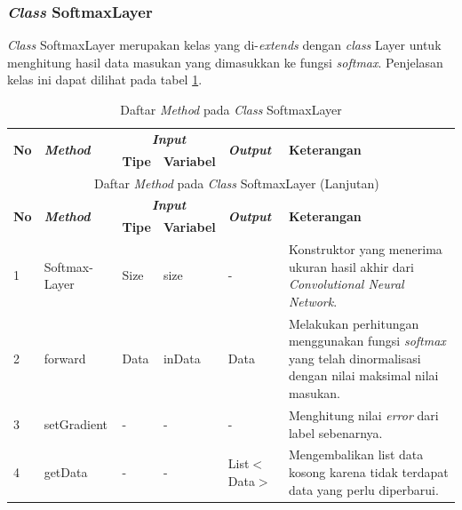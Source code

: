 \subsubsection{\textit{Class} SoftmaxLayer}
\noindent \textit{Class} SoftmaxLayer merupakan kelas yang di-\textit{extends} dengan \textit{class} Layer untuk menghitung hasil data masukan yang dimasukkan ke fungsi \textit{softmax}. Penjelasan kelas ini dapat dilihat pada tabel \ref{tbl:classSoftmaxLayer}.
\begingroup
\setlength{\LTleft}{-20cm plus -1fill}
\setlength{\LTright}{\LTleft}
\begin{small}
\begin{longtable}{|p{0.4cm}|p{2cm}|p{1.8cm}|p{1.8cm}|p{1.7cm}|p{3.55cm}|}
	\caption{Daftar \textit{Method} pada \textit{Class} SoftmaxLayer \label{tbl:classSoftmaxLayer}}\\
	\hline
	\multirow{2}{*}{\textbf{No}} & \multirow{2}{*}{\textit{\textbf{Method}}} & \multicolumn{2}{c|}{\textit{\textbf{Input}}} & \multirow{2}{*}{\textit{\textbf{Output}}} & 
	\multirow{2}{*}{\textbf{Keterangan}}\\
	\cline{3-4}
	& & \textbf{Tipe} & \textbf{Variabel} & & \\
	\endfirsthead
	\multicolumn{6}{c}{\textbf{\tablename~\thetable} Daftar \textit{Method} pada \textit{Class} SoftmaxLayer (Lanjutan)} \\
	\hline
	\multirow{2}{*}{\textbf{No}} & \multirow{2}{*}{\textit{\textbf{Method}}} & \multicolumn{2}{c|}{\textit{\textbf{Input}}} & \multirow{2}{*}{\textit{\textbf{Output}}} & 
	\multirow{2}{*}{\textbf{Keterangan}}\\
	\cline{3-4}
	& & \textbf{Tipe} & \textbf{Variabel} & & \\
	\endhead
	\hline
	1 & Softmax-\newline Layer & Size & size & - & Konstruktor yang menerima ukuran hasil akhir dari \textit{Convolutional Neural Network}.\\
	\hline
	2 & forward & Data & inData & Data & Melakukan perhitungan menggunakan fungsi \textit{softmax} yang telah dinormalisasi dengan nilai maksimal nilai masukan.\\
	\hline
	3 & setGradient & - & - & - & Menghitung nilai \textit{error} dari label sebenarnya.\\
	\hline
	4 & getData & - & - & List$<$Data$>$ & Mengembalikan list data kosong karena tidak terdapat data yang perlu diperbarui.\\
	\hline
\end{longtable}
\end{small}
\endgroup

